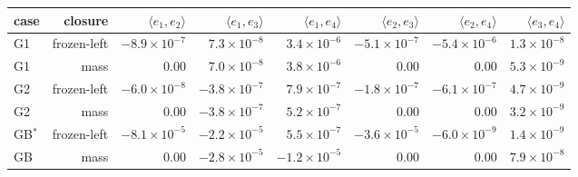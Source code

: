\begin{tabular}{lrrrrrrr}
\toprule
case & closure & $\langle e_1, e_2\rangle$ & $\langle e_1, e_3\rangle$ & $\langle e_1, e_4\rangle$ & $\langle e_2, e_3\rangle$ & $\langle e_2, e_4\rangle$ & $\langle e_3, e_4\rangle$ \\
\midrule
G1 & frozen-left & $-8.9\times10^{-7}$ & $7.3\times10^{-8}$ & $3.4\times10^{-6}$ & $-5.1\times10^{-7}$ & $-5.4\times10^{-6}$ & $1.3\times10^{-8}$ \\
G1 & mass & 0.00 & $7.0\times10^{-8}$ & $3.8\times10^{-6}$ & 0.00 & 0.00 & $5.3\times10^{-9}$ \\
G2 & frozen-left & $-6.0\times10^{-8}$ & $-3.8\times10^{-7}$ & $7.9\times10^{-7}$ & $-1.8\times10^{-7}$ & $-6.1\times10^{-7}$ & $4.7\times10^{-9}$ \\
G2 & mass & 0.00 & $-3.8\times10^{-7}$ & $5.2\times10^{-7}$ & 0.00 & 0.00 & $3.2\times10^{-9}$ \\
GB$^{*}$ & frozen-left & $-8.1\times10^{-5}$ & $-2.2\times10^{-5}$ & $5.5\times10^{-7}$ & $-3.6\times10^{-5}$ & $-6.0\times10^{-9}$ & $1.4\times10^{-9}$ \\
GB & mass & 0.00 & $-2.8\times10^{-5}$ & $-1.2\times10^{-5}$ & 0.00 & 0.00 & $7.9\times10^{-8}$ \\
\bottomrule
\end{tabular}
